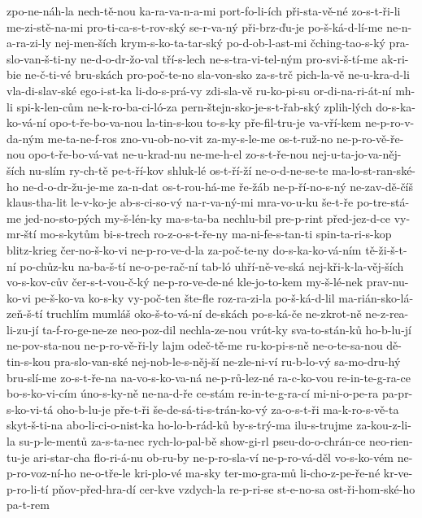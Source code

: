 {zpo-ne-náh-la
nech-tě-nou
ka-ra-va-n-a-mi
port-fo-li-ích
při-sta-vě-né
zo-s-t-ři-li
me-zi-stě-na-mi
pro-ti-ca-s-t-rov-ský
se-r-va-ný
při-brz-ďu-je
po-š-ká-d-lí-me
ne-n-a-ra-zi-ly
nej-men-ších
krym-s-ko-ta-tar-ský
po-d-ob-l-ast-mi
čching-tao-s-ký
pra-slo-van-š-ti-ny
ne-d-o-dr-žo-val
tří-s-lech
ne-s-tra-vi-tel-ným
pro-svi-š-tí-me
ak-ri-bie
ne-č-ti-vé
bru-skách
pro-poč-te-no
sla-von-sko
za-s-trč
pich-la-vě
ne-u-kra-d-li
vla-di-slav-ské
ego-i-st-ka
li-do-s-prá-vy
zdi-sla-vě
ru-ko-pi-su
or-di-na-ri-át-ní
mh-li
spi-k-len-cům
ne-k-ro-ba-ci-ló-za
pern-štejn-sko-je-s-t-řab-ský
zplih-lých
do-s-ka-ko-vá-ní
opo-t-ře-bo-va-nou
la-tin-s-kou
to-s-ky
pře-fil-tru-je
va-vří-kem
ne-p-ro-v-da-ným
me-ta-ne-f-ros
zno-vu-ob-no-vit
za-my-s-le-me
os-t-ruž-no
ne-p-ro-vě-ře-nou
opo-t-ře-bo-vá-vat
ne-u-krad-nu
ne-me-h-el
zo-s-t-ře-nou
nej-u-ta-jo-va-něj-ších
nu-slím
ry-ch-tě
pe-t-ří-kov
shluk-lé
os-t-ří-ží
ne-o-d-ne-se-te
ma-lo-st-ran-ské-ho
ne-d-o-dr-žu-je-me
za-n-dat
os-t-rou-há-me
ře-žáb
ne-p-ří-no-s-ný
ne-zav-dě-číš
klaus-tha-lit
le-v-ko-je
ab-s-ci-so-vý
na-r-va-ný-mi
mra-vo-u-ku
še-t-ře
po-tre-stá-me
jed-no-sto-pých
my-š-lén-ky
ma-s-ta-ba
nechlu-bil
pre-p-rint
před-jez-d-ce
vy-mr-ští
mo-s-kytům
bi-s-trech
ro-z-o-s-t-ře-ny
ma-ni-fe-s-tan-ti
spin-ta-ri-s-kop
blitz-krieg
čer-no-š-ko-vi
ne-p-ro-ve-d-la
za-poč-te-ny
do-s-ka-ko-vá-ním
tě-ži-š-t-ní
po-chůz-ku
na-ba-š-tí
ne-o-pe-rač-ní
tab-ló
uhří-ně-ve-ská
nej-kři-k-la-věj-ších
vo-s-kov-cův
čer-s-t-vou-č-ký
ne-p-ro-ve-de-né
kle-jo-to-kem
my-š-lé-nek
prav-nu-ko-vi
pe-š-ko-va
ko-s-ky
vy-poč-ten
šte-fle
roz-ra-zi-la
po-š-ká-d-lil
ma-rián-sko-lá-zeň-š-tí
truchlím
mumláš
oko-š-to-vá-ní
de-skách
po-s-ká-če
ne-zkrot-ně
ne-z-rea-li-zu-jí
ta-f-ro-ge-ne-ze
neo-poz-dil
nechla-ze-nou
vrút-ky
sva-to-stán-ků
ho-b-lu-jí
ne-pov-sta-nou
ne-p-ro-vě-ři-ly
lajm
odeč-tě-me
ru-ko-pi-s-ně
ne-o-te-sa-nou
dě-tin-s-kou
pra-slo-van-ské
nej-nob-le-s-něj-ší
ne-zle-ni-ví
ru-b-lo-vý
sa-mo-dru-hý
bru-slí-me
zo-s-t-ře-na
na-vo-s-ko-va-ná
ne-p-rů-lez-né
ra-c-ko-vou
re-in-te-g-ra-ce
bo-s-ko-vi-cím
úno-s-ky-ně
ne-na-d-ře
ce-stám
re-in-te-g-ra-cí
mi-ni-o-pe-ra
pa-pr-s-ko-vi-tá
oho-b-lu-je
pře-t-ři
še-de-sá-ti-s-trán-ko-vý
za-o-s-t-ři
ma-k-ro-s-vě-ta
skyt-š-ti-na
abo-li-ci-o-nist-ka
ho-lo-b-rád-ků
by-s-trý-ma
ilu-s-trujme
za-kou-z-li-la
su-p-le-mentů
za-s-ta-nec
rych-lo-pal-bě
show-gi-rl
pseu-do-o-chrán-ce
neo-rien-tu-je
ari-star-cha
flo-ri-á-nu
ob-ru-by
ne-p-ro-sla-ví
ne-p-ro-vá-děl
vo-s-ko-vém
ne-p-ro-voz-ní-ho
ne-o-tře-le
kri-plo-vé
ma-sky
ter-mo-gra-mů
li-cho-z-pe-ře-né
kr-ve-p-ro-li-tí
pňov-před-hra-dí
cer-kve
vzdych-la
re-p-ri-se
st-e-no-sa
ost-ři-hom-ské-ho
pa-t-rem
}
